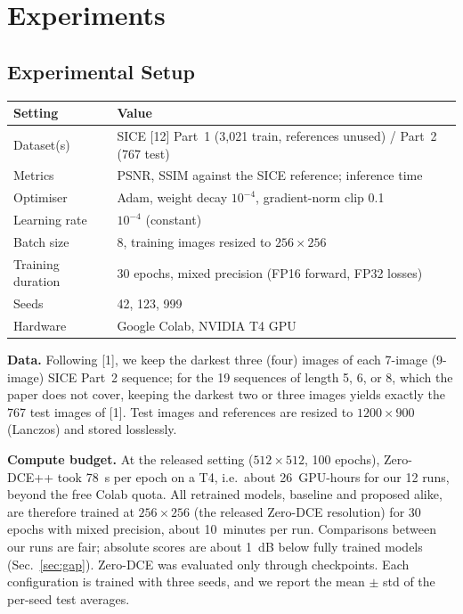 \documentclass[11pt, letterpaper]{article}
\begin{document}
\section{Experiments}

\subsection{Experimental Setup}

\begin{tabular}{ll}
\toprule
\textbf{Setting} & \textbf{Value} \\
\midrule
Dataset(s) & SICE [12] Part~1 (3{,}021 train, references unused) / Part~2 (767 test) \\
Metrics & PSNR, SSIM against the SICE reference; inference time \\
Optimiser & Adam, weight decay $10^{-4}$, gradient-norm clip 0.1 \\
Learning rate & $10^{-4}$ (constant) \\
Batch size & 8, training images resized to $256\times256$ \\
Training duration & 30 epochs, mixed precision (FP16 forward, FP32 losses) \\
Seeds & 42, 123, 999 \\
Hardware & Google Colab, NVIDIA T4 GPU \\
\bottomrule
\end{tabular}

\textbf{Data.} Following [1], we keep the darkest three (four) images of each
7-image (9-image) SICE Part~2 sequence; for the 19 sequences of length 5, 6, or 8,
which the paper does not cover, keeping the darkest two or three images yields
exactly the 767 test images of [1]. Test images and references are resized to
$1200\times900$ (Lanczos) and stored losslessly.

\textbf{Compute budget.} At the released setting ($512\times512$, 100 epochs),
Zero-DCE++ took 78~s per epoch on a T4, i.e.\ about 26~GPU-hours for our 12 runs,
beyond the free Colab quota. All retrained models, baseline and proposed alike, are
therefore trained at $256\times256$ (the released Zero-DCE resolution) for 30
epochs with mixed precision, about 10~minutes per run. Comparisons between our runs
are fair; absolute scores are about 1~dB below fully trained models
(Sec.~\ref{sec:gap}). Zero-DCE was evaluated only through checkpoints. Each
configuration is trained with three seeds, and we report the mean $\pm$ std of the
per-seed test averages.
\end{document}
